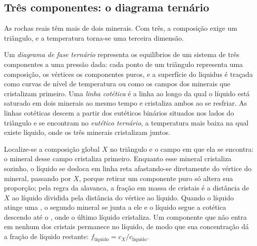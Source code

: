 \subsection*{Três componentes: o diagrama ternário}

As rochas reais têm mais de dois minerais. Com três, a composição exige um
triângulo, e a temperatura torna-se uma terceira dimensão.

\begin{definition}\label{def:b2:mantle-melting:ternary}
Um \emph{diagrama de fase ternário} representa os
equilíbrios de um sistema de três componentes a uma pressão dada: cada ponto de um
triângulo representa uma composição, os vértices os componentes puros, e a
superfície do liquidus é traçada como curvas de nível de temperatura ou como os campos dos
minerais que cristalizam primeiro. Uma \emph{linha cotética} é
a linha ao longo da qual o líquido está saturado em dois minerais ao mesmo tempo e
cristaliza ambos ao se resfriar. As linhas cotéticas descem a partir dos eutéticos
binários situados nos lados do triângulo e se encontram no \emph{eutético
ternário}, a temperatura mais baixa na qual existe líquido,
onde os três minerais cristalizam juntos.
\end{definition}

\begin{method}\label{met:b2:mantle-melting:ternary}
Localize-se a composição global $X$ no triângulo e o campo em que ela se encontra:
o mineral desse campo cristaliza primeiro. Enquanto esse mineral cristaliza sozinho,
o líquido se desloca em linha reta afastando-se diretamente do vértice do mineral,
passando por $X$, porque retirar um componente puro só altera sua proporção; pela
regra da alavanca, a fração em massa de cristais é a distância de $X$ ao líquido
dividida pela distância do vértice ao líquido. Quando o líquido atinge uma
, o segundo mineral se junta a ele e o líquido segue a cotética
descendo até o , onde o último líquido cristaliza. Um componente
que não entra em nenhum dos cristais permanece no líquido, de modo que sua concentração dá
a fração de líquido restante: $f_{\text{líquido}} = c_X/c_{\text{líquido}}$.
\end{method}


